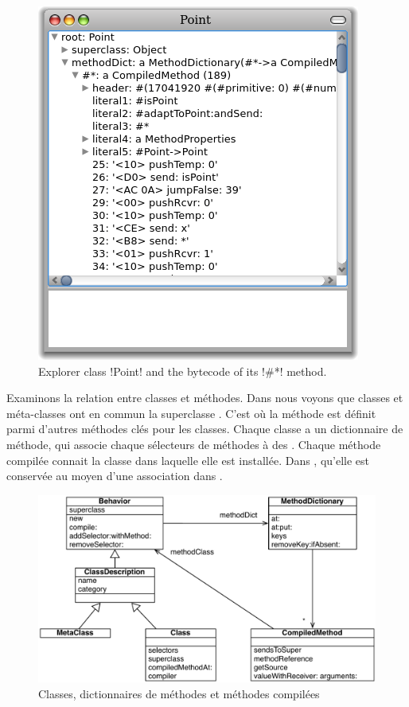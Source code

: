 \documentclass[a4paper,10pt,twoside]{book}
\begin{document}
\begin{figure}[ht]\centering
	\includegraphics[width=.5\linewidth]{CompiledMethod}
	\caption{Explorer class \ct!Point! and the bytecode of its \ct!\#*! method.}
\end{figure}

Examinons la relation entre classes et méthodes.
Dans  nous voyons que classes et méta-classes ont en commun la superclasse . C'est où la méthode  est définit parmi d'autres méthodes clés pour les classes.
Chaque classe a un dictionnaire de méthode, qui associe chaque sélecteurs de méthodes à des .
Chaque méthode compilée connait la classe dans laquelle elle est installée.
Dans , qu'elle est conservée au moyen d'une association dans .

\begin{figure}[ht]\centering
	\includegraphics[width=\linewidth]{MethodsAsObjects}
	\caption{Classes, dictionnaires de méthodes et méthodes compilées}
\end{figure}
\end{document}
